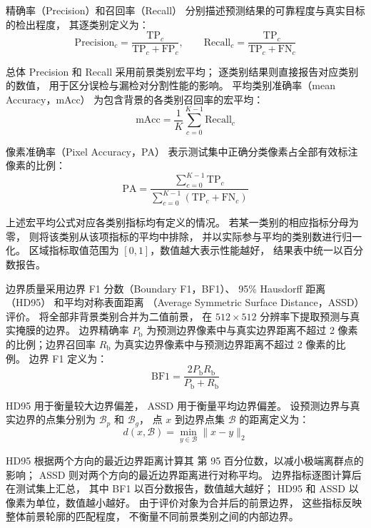精确率（Precision）和召回率（Recall）
分别描述预测结果的可靠程度与真实目标的检出程度，
其逐类别定义为：
\begin{equation}
\mathrm{Precision}_c=
\frac{\mathrm{TP}_c}
{\mathrm{TP}_c+\mathrm{FP}_c},
\qquad
\mathrm{Recall}_c=
\frac{\mathrm{TP}_c}
{\mathrm{TP}_c+\mathrm{FN}_c}
\label{eq:exp-precision-recall}
\end{equation}

总体 Precision 和 Recall 采用前景类别宏平均；
逐类别结果则直接报告对应类别的数值，
用于区分误检与漏检对分割性能的影响。
平均类别准确率（mean Accuracy，mAcc）
为包含背景的各类别召回率的宏平均：
\begin{equation}
\mathrm{mAcc}=
\frac{1}{K}\sum_{c=0}^{K-1}
\mathrm{Recall}_c
\label{eq:exp-macc}
\end{equation}

像素准确率（Pixel Accuracy，PA）
表示测试集中正确分类像素占全部有效标注像素的比例：
\begin{equation}
\mathrm{PA}=
\frac{\sum_{c=0}^{K-1}\mathrm{TP}_c}
{\sum_{c=0}^{K-1}
\left(\mathrm{TP}_c+\mathrm{FN}_c\right)}
\label{eq:exp-pa}
\end{equation}

上述宏平均公式对应各类别指标均有定义的情况。
若某一类别的相应指标分母为零，
则将该类别从该项指标的平均中排除，
并以实际参与平均的类别数进行归一化。
区域指标取值范围为 \([0,1]\)，数值越大表示性能越好，
结果表中统一以百分数报告。

边界质量采用边界 F1 分数（Boundary F1，BF1）、
95\% Hausdorff 距离（HD95）
和平均对称表面距离
（Average Symmetric Surface Distance，ASSD）评价。
将全部非背景类别合并为二值前景，
在 \(512\times512\) 分辨率下提取预测与真实掩膜的边界。
边界精确率 \(P_{\mathrm{b}}\)
为预测边界像素中与真实边界距离不超过
2 像素的比例；边界召回率 \(R_{\mathrm{b}}\)
为真实边界像素中与预测边界距离不超过
2 像素的比例。
边界 F1 定义为：
\begin{equation}
\mathrm{BF1}=
\frac{2P_{\mathrm{b}}R_{\mathrm{b}}}
{P_{\mathrm{b}}+R_{\mathrm{b}}}
\label{eq:exp-boundary-f1}
\end{equation}

HD95 用于衡量较大边界偏差，
ASSD 用于衡量平均边界偏差。
设预测边界与真实边界的点集分别为
\(\mathcal{B}_{p}\) 和 \(\mathcal{B}_{g}\)，
点 \(x\) 到边界点集 \(\mathcal{B}\) 的距离定义为：
\begin{equation}
d(x,\mathcal{B})=
\min_{y\in\mathcal{B}}\|x-y\|_2
\label{eq:exp-boundary-distance}
\end{equation}

HD95 根据两个方向的最近边界距离计算其
第 95 百分位数，以减小极端离群点的影响；
ASSD 则对两个方向的最近边界距离进行对称平均。
边界指标逐图计算后在测试集上汇总，
其中 BF1 以百分数报告，数值越大越好；
HD95 和 ASSD 以像素为单位，数值越小越好。
由于评价对象为合并后的前景边界，
这些指标反映整体前景轮廓的匹配程度，
不衡量不同前景类别之间的内部边界。

